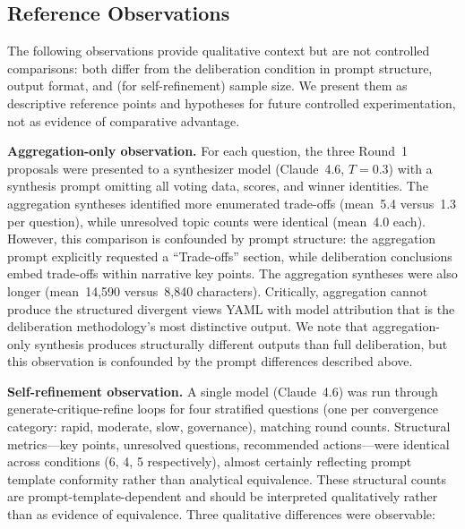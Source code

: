 \documentclass[11pt,a4paper]{article}
\begin{document}
\subsection{Reference Observations}
\label{sec:baselines}

The following observations provide qualitative context but are not controlled comparisons: both differ from the deliberation condition in prompt structure, output format, and (for self-refinement) sample size. We present them as descriptive reference points and hypotheses for future controlled experimentation, not as evidence of comparative advantage.

\textbf{Aggregation-only observation.} For each question, the three Round~1 proposals were presented to a synthesizer model (Claude~4.6, $T = 0.3$) with a synthesis prompt omitting all voting data, scores, and winner identities. The aggregation syntheses identified more enumerated trade-offs (mean~5.4 versus~1.3 per question), while unresolved topic counts were identical (mean~4.0 each). However, this comparison is confounded by prompt structure: the aggregation prompt explicitly requested a ``Trade-offs'' section, while deliberation conclusions embed trade-offs within narrative key points. The aggregation syntheses were also longer (mean~14{,}590 versus~8{,}840 characters). Critically, aggregation cannot produce the structured divergent views YAML with model attribution that is the deliberation methodology's most distinctive output. We note that aggregation-only synthesis produces structurally different outputs than full deliberation, but this observation is confounded by the prompt differences described above.

\textbf{Self-refinement observation.} A single model (Claude~4.6) was run through generate-critique-refine loops for four stratified questions (one per convergence category: rapid, moderate, slow, governance), matching round counts. Structural metrics---key points, unresolved questions, recommended actions---were identical across conditions (6, 4, 5 respectively), almost certainly reflecting prompt template conformity rather than analytical equivalence. These structural counts are prompt-template-dependent and should be interpreted qualitatively rather than as evidence of equivalence. Three qualitative differences were observable:
\end{document}
